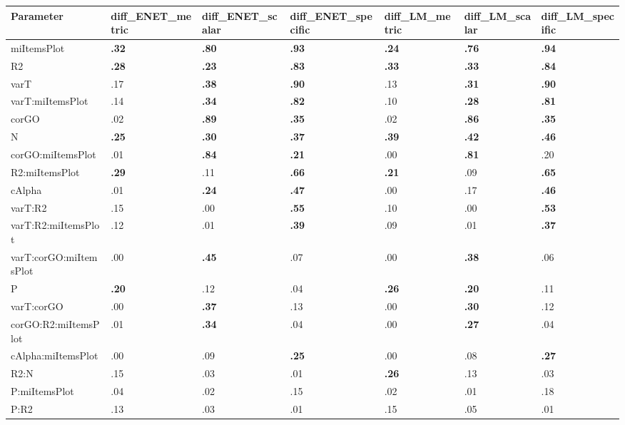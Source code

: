 \begin{table}[ht]
\centering
\begin{tabular}{lllllll}
  \hline
Parameter & diff_ENET_metric & diff_ENET_scalar & diff_ENET_specific & diff_LM_metric & diff_LM_scalar & diff_LM_specific \\ 
  \hline
miItemsPlot & \textbf{.32} & \textbf{.80} & \textbf{.93} & \textbf{.24} & \textbf{.76} & \textbf{.94} \\ 
  R2 & \textbf{.28} & \textbf{.23} & \textbf{.83} & \textbf{.33} & \textbf{.33} & \textbf{.84} \\ 
  varT & .17 & \textbf{.38} & \textbf{.90} & .13 & \textbf{.31} & \textbf{.90} \\ 
  varT:miItemsPlot & .14 & \textbf{.34} & \textbf{.82} & .10 & \textbf{.28} & \textbf{.81} \\ 
  corGO & .02 & \textbf{.89} & \textbf{.35} & .02 & \textbf{.86} & \textbf{.35} \\ 
  N & \textbf{.25} & \textbf{.30} & \textbf{.37} & \textbf{.39} & \textbf{.42} & \textbf{.46} \\ 
  corGO:miItemsPlot & .01 & \textbf{.84} & \textbf{.21} & .00 & \textbf{.81} & .20 \\ 
  R2:miItemsPlot & \textbf{.29} & .11 & \textbf{.66} & \textbf{.21} & .09 & \textbf{.65} \\ 
  cAlpha & .01 & \textbf{.24} & \textbf{.47} & .00 & .17 & \textbf{.46} \\ 
  varT:R2 & .15 & .00 & \textbf{.55} & .10 & .00 & \textbf{.53} \\ 
  varT:R2:miItemsPlot & .12 & .01 & \textbf{.39} & .09 & .01 & \textbf{.37} \\ 
  varT:corGO:miItemsPlot & .00 & \textbf{.45} & .07 & .00 & \textbf{.38} & .06 \\ 
  P & \textbf{.20} & .12 & .04 & \textbf{.26} & \textbf{.20} & .11 \\ 
  varT:corGO & .00 & \textbf{.37} & .13 & .00 & \textbf{.30} & .12 \\ 
  corGO:R2:miItemsPlot & .01 & \textbf{.34} & .04 & .00 & \textbf{.27} & .04 \\ 
  cAlpha:miItemsPlot & .00 & .09 & \textbf{.25} & .00 & .08 & \textbf{.27} \\ 
  R2:N & .15 & .03 & .01 & \textbf{.26} & .13 & .03 \\ 
  P:miItemsPlot & .04 & .02 & .15 & .02 & .01 & .18 \\ 
  P:R2 & .13 & .03 & .01 & .15 & .05 & .01 \\ 

\end{tabular}
\end{table}
